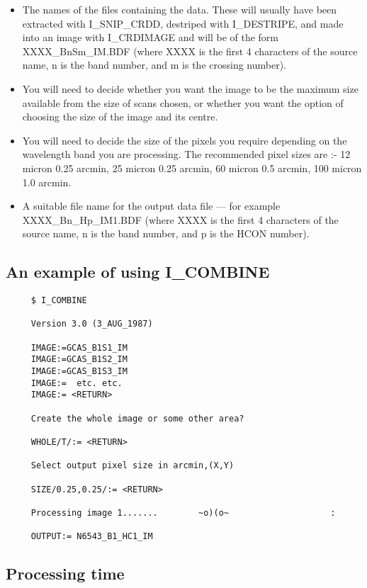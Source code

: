 \begin{itemize}
\item The names of the files containing the data. These will usually have been
extracted with I\_SNIP\_CRDD, destriped with I\_DESTRIPE, and made into an
image with I\_CRDIMAGE and will be of the form XXXX\_BnSm\_IM.BDF (where XXXX
is the first 4 characters of the source name, n is the band number, and m is
the crossing number).

\item You will need to decide whether you want the image to be the maximum size
available from the size of scans chosen, or whether you want the option of
choosing the size of the image and its centre.

\item You will need to decide the size of the pixels you require depending
on the wavelength band you are processing. The recommended pixel sizes are :-
12 micron  0.25 arcmin, 25 micron  0.25 arcmin, 60 micron   0.5 arcmin,
100 micron  1.0 arcmin.

\item A suitable file name for the output data file --- for example
XXXX\_Bn\_Hp\_IM1.BDF (where XXXX is the first 4 characters of the source
name, n is the band number, and p is the HCON number).

\end {itemize}

\subsection {An example of using I\_COMBINE}

\begin {verbatim}
     $ I_COMBINE

     Version 3.0 (3_AUG_1987)

     IMAGE:=GCAS_B1S1_IM
     IMAGE:=GCAS_B1S2_IM
     IMAGE:=GCAS_B1S3_IM
     IMAGE:=  etc. etc.
     IMAGE:= <RETURN>

     Create the whole image or some other area?

     WHOLE/T/:= <RETURN>

     Select output pixel size in arcmin,(X,Y)

     SIZE/0.25,0.25/:= <RETURN>

     Processing image 1.......        ~o)(o~                    :

     OUTPUT:= N6543_B1_HC1_IM
\end{verbatim}

\subsection {Processing time}

